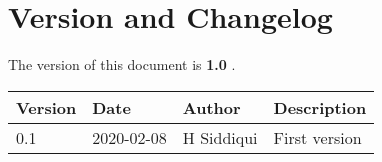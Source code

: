 \section{Version and Changelog}

The version of this document is {\bf 1.0} .

\begin{table}[H]
    \begin{tabular}{|l|l|l|p{10cm}| }
    \hline
    {\bf Version} & {\bf Date} & {\bf Author} & {\bf Description} \\ \hline
    0.1 & 2020-02-08 & H Siddiqui & First version \\ \hline
    \end{tabular}
\end{table}

